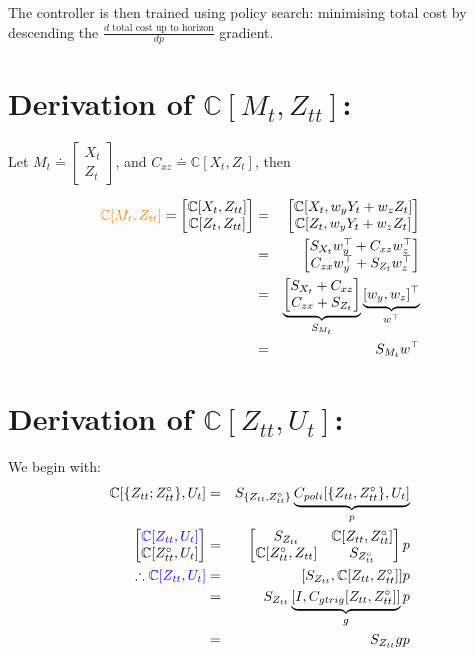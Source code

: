 \documentclass[9pt]{article}
\newcommand{\Cov}{{\mathbb C}}
\newcommand{\now}[1]{#1_t}                  %
\newcommand{\pno}[1]{#1_{t}}  %
\newcommand{\uno}[1]{#1_{tt}}              %
\newcommand{\uot}[1]{\uno{#1}^\circ}       %
\newcommand{\nnn}{\nonumber \\}
\newcommand{\orange}[1]{\textcolor{orange}{#1}}
\newcommand{\blue}[1]{\textcolor{blue}{#1}}
\begin{document}
\noindent
The controller is then trained using policy search: minimising total cost by descending the $\frac{d \text{ total cost up to horizon}}{d p}$ gradient.


\newpage
\appendix %

\section{Derivation of $\Cov[\now{M},\uno{Z}]$:}

Let $\now{M} \doteq \left[\!\begin{array}{c}\now{X}\\\pno{Z}\!\end{array}\right]$, and
$C_{xz} \doteq \Cov[\now{X},\pno{Z}]$, then

\begin{eqnarray}
\orange{\Cov[\now{M},\uno{Z}]} =
\begin{bmatrix} \Cov[\now{X},\uno{Z}] \\ \Cov[\pno{Z},\uno{Z}] \end{bmatrix}
&=& \begin{bmatrix} \Cov[\now{X},w_y \now{Y} + w_z \pno{Z}] \\ \Cov[\pno{Z},w_y \now{Y} + w_z \pno{Z}] \end{bmatrix} \nnn
&=& \begin{bmatrix} S_{\now{X}} w_y^\top + C_{xz} w_z^\top \\ C_{zx} w_y^\top + S_{\pno{Z}} w_z^\top\end{bmatrix} \nnn
&=& \underbrace{\begin{bmatrix} S_{\now{X}} + C_{xz} \\ C_{zx} + S_{\pno{Z}}\end{bmatrix}}_{S_{\now{M}}} \underbrace{[w_y,w_z]^\top}_{w^\top} \nnn
&=& S_{\now{M}} w^\top
\end{eqnarray}

\section{Derivation of $\Cov[\uno{Z},\now{U}]$:} %

We begin with:
\begin{eqnarray}
 \Cov[\{\uno{Z};\uot{Z}\},\now{U}] &=& S_{\{\uno{Z},\uot{Z}\}} \underbrace{C_{poli}[\{\uno{Z},\uot{Z}\},\now{U}]}_{p} \nnn
 \begin{bmatrix} \blue{\Cov[\uno{Z},\now{U}]} \\ \Cov[\uot{Z},\now{U}] \end{bmatrix} &=& \begin{bmatrix} S_{\uno{Z}} & \Cov[\uno{Z},\uot{Z}] \\ \Cov[\uot{Z},\uno{Z}] & S_{\uot{Z}} \end{bmatrix} p \nnn
 \therefore \blue{\Cov[\uno{Z},\now{U}]} &=& [ S_{\uno{Z}} , \Cov[\uno{Z},\uot{Z}] ] p \nnn
                          &=& S_{\uno{Z}} \underbrace{[ I , C_{gtrig}[\uno{Z},\uot{Z}] ]}_{g} p \nnn
                          &=& S_{\uno{Z}} g p \label{eq:czu1}
\end{eqnarray}
\end{document}
